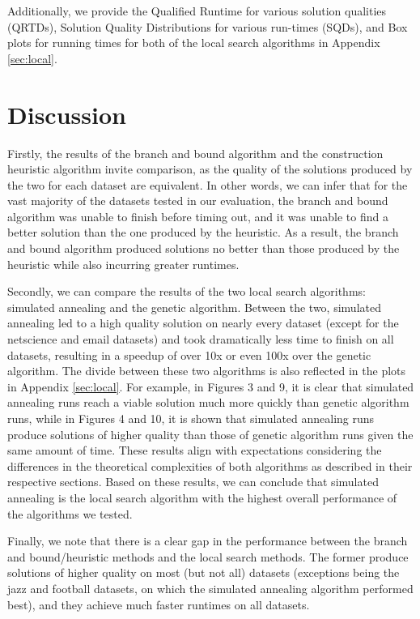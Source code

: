 \documentclass[acmlarge]{acmart}
\begin{document}
Additionally, we provide the Qualified Runtime for various solution qualities (QRTDs), Solution Quality Distributions for various run-times (SQDs), and Box plots for running times for both of the local search algorithms in Appendix \ref{sec:local}.

\section{Discussion}

Firstly, the results of the branch and bound algorithm and the construction heuristic algorithm invite comparison, as the quality of the solutions produced by the two for each dataset are equivalent. In other words, we can infer that for the vast majority of the datasets tested in our evaluation, the branch and bound algorithm was unable to finish before timing out, and it was unable to find a better solution than the one produced by the heuristic. As a result, the branch and bound algorithm produced solutions no better than those produced by the heuristic while also incurring greater runtimes.

Secondly, we can compare the results of the two local search algorithms: simulated annealing and the genetic algorithm. Between the two, simulated annealing led to a high quality solution on nearly every dataset (except for the netscience and email datasets) and took dramatically less time to finish on all datasets, resulting in a speedup of over 10x or even 100x over the genetic algorithm. The divide between these two algorithms is also reflected in the plots in Appendix \ref{sec:local}. For example, in Figures 3 and 9, it is clear that simulated annealing runs reach a viable solution much more quickly than genetic algorithm runs, while in Figures 4 and 10, it is shown that simulated annealing runs produce solutions of higher quality than those of genetic algorithm runs given the same amount of time. These results align with expectations considering the differences in the theoretical complexities of both algorithms as described in their respective sections. Based on these results, we can conclude that simulated annealing is the local search algorithm with the highest overall performance of the algorithms we tested.

Finally, we note that there is a clear gap in the performance between the branch and bound/heuristic methods and the local search methods. The former produce solutions of higher quality on most (but not all) datasets (exceptions being the jazz and football datasets, on which the simulated annealing algorithm performed best), and they achieve much faster runtimes on all datasets.
\end{document}
